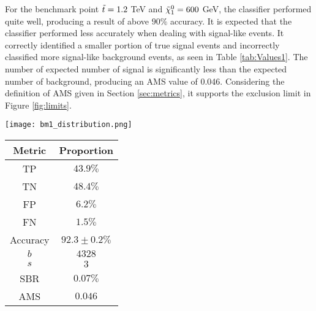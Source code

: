 For the benchmark point $\Tilde{t} = 1.2$ TeV and $\Tilde{\chi}_1^0 = 600$ GeV, the classifier performed quite well, producing a result of above $90\%$ accuracy. It is expected that the classifier performed less accurately when dealing with signal-like events. It correctly identified a smaller portion of true signal events and incorrectly classified more signal-like background events, as seen in Table \ref{tab:Values1}. The number of expected number of signal is significantly less than the expected number of background, producing an AMS value of 0.046. Considering the definition of AMS given in Section \ref{sec:metrics}, it supports the exclusion limit in Figure \ref{fig:limits}. \\

\noindent\begin{minipage}{\textwidth}
\centering
  \begin{minipage}[htbp]{0.65\textwidth}
    \centering
    \texttt{[image: bm1\_distribution.png]}
    \label{fig:dist_bm1}
  \end{minipage}
  \hfill
  \begin{minipage}[htbp]{0.34\textwidth}
        \centering
        \begin{tabular}{c|c} 
        \toprule
        Metric & Proportion \\
        \midrule
        \rowcolor{gray!6} TP & $43.9 \%$ \\
        TN & $48.4 \%$ \\
        \rowcolor{gray!6} FP & $6.2 \%$\\
        FN & $1.5 \%$ \\
        \rowcolor{gray!6} Accuracy & $92.3 \pm 0.2 \%$ \\
        \midrule
        $b$ & $4328$ \\
        \rowcolor{gray!6} $s$ & $3$ \\
        SBR & $0.07\%$\\
        \rowcolor{gray!6} AMS & $0.046$ \\
        \bottomrule
        \end{tabular}
        \label{tab:Values1}
    \end{minipage}
\end{minipage}

